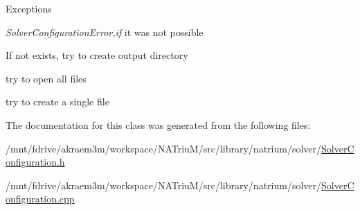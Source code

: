 \begin{DoxyExceptions}{Exceptions}
\item[{\em SolverConfigurationError,if}]it was not possible \end{DoxyExceptions}


If not exists, try to create output directory

try to open all files

try to create a single file 

The documentation for this class was generated from the following files:\begin{DoxyCompactItemize}
\item 
/mnt/fdrive/akraem3m/workspace/NATriuM/src/library/natrium/solver/\hyperlink{SolverConfiguration_8h}{SolverConfiguration.h}\item 
/mnt/fdrive/akraem3m/workspace/NATriuM/src/library/natrium/solver/\hyperlink{SolverConfiguration_8cpp}{SolverConfiguration.cpp}\end{DoxyCompactItemize}
